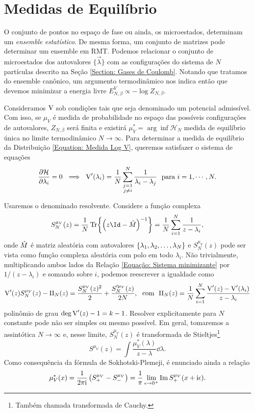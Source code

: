 \section{Medidas de Equilíbrio}
\label{Seção: Medida}
O conjunto de pontos no espaço de fase ou ainda, os microestados, determinam um \textit{ensemble estatístico}. De mesma forma, um conjunto de matrizes pode determinar um ensemble em RMT. Podemos relacionar o conjunto de microestados dos autovalores $\{\vec{\lambda}\}$ com as configurações do sistema de $N$ partículas descrito na Seção \ref{Section: Gases de Coulomb}. Notando que tratamos do ensemble canônico, um argumento termodinâmico nos indica então que devemos minimizar a energia livre $E^V_{N,\beta} \propto - \log{Z_{N, \beta}}.$

Consideramos $\operatorname{V}$ sob condições tais que seja denominado um potencial admissível. \cite{ChafaCoulombMeasure} Com isso, se $\mu_{V}$ é medida de probabilidade no espaço das possíveis configurações de autovalores, $Z_{N, \beta}$ será finita e existirá $\mu_{V}^* = \arg \inf {\mathcal{H}_N}$ medida de equilíbrio única no limite termodinâmico $N \rightarrow \infty$. Para determinar a medida de equilíbrio da Distribuição \eqref{Equation: Medida Log V}, \cite{RMT-firstcourse-Potters} queremos satisfazer o sistema de equações
\begin{equation}
	\frac{\partial \mathcal{H}}{\partial \lambda_i} = 0 \ \implies \ \operatorname{V}'(\lambda_i) = \frac{1}{N} \sum_{\substack{j=1 \\ j \neq i}}^{N} \frac{1}{\lambda_i - \lambda_j} \ \ \text{para} \ i = 1, \cdots, N.
	\label{Equação: Sistema minimizante}
\end{equation} 

Usaremos o denominado resolvente. Considere a função complexa $$S^{\mu_V}_N(z) = \frac{1}{N} \Tr{\left(z\Id - \matriz{M}\right)^{-1}} = \frac{1}{N} \sum_{i=1}^{N} \frac{1}{z - \lambda_i},$$ onde $\hat M$ é matriz aleatória com autovalores $\{\lambda_1, \lambda_2, \dots, \lambda_N\}$ e $S^{\mu_V}_N(z)$ pode ser vista como função complexa aleatória com polo em todo $\lambda_i$. Não trivialmente, multiplicando ambos lados da Relação \eqref{Equação: Sistema minimizante} por $1/(z-\lambda_i)$ e somando sobre $i$, podemos reescrever a igualdade como $$\operatorname{V}'(z) S^{\mu_V}_N(z) - \Pi_N(z) = \frac{S^{\mu_V}_N (z)^2}{2} + \frac{S'^{\mu_V}_N(z)}{2N}, \ \ \text{com}\ \  \Pi_N(z) = \frac{1}{N} \sum_{i = 1}^{N} \frac{\operatorname{V}'(z) - \operatorname{V}'(\lambda_i)}{z - \lambda_i}$$ polinômio de grau $\deg{\operatorname{V}'(z)} - 1 = k - 1$. Resolver explicitamente para $N$ constante pode não ser simples ou mesmo possível. Em geral, tomaremos a assintótica $N \to \infty$ e, nesse limite, $S^{\mu_V}_N(z)$ é transformada de Stieltjes\footnote{Também chamada transformada de Cauchy.} $$S^{\mu_V}(z) = \int \frac{\mu^*_V(\lambda)}{z - \lambda} \dd \lambda.$$ Como consequência da fórmula de Sokhotski-Plemeji, é enunciado ainda a relação 
\begin{equation}
	\mu^{*}_{V}(x) = \frac{1}{2\pi \mathrm{i}} \left( S^{\mu_V}_{+} -  S^{\mu_V}_{-}\right) = \frac{1}{\pi} \lim_{\epsilon \to 0^+} \operatorname{Im}{S^{\mu_V}_{+}(x + \mathrm{i}\epsilon)}.
	\label{Equation: p(lambda)}
\end{equation} 

